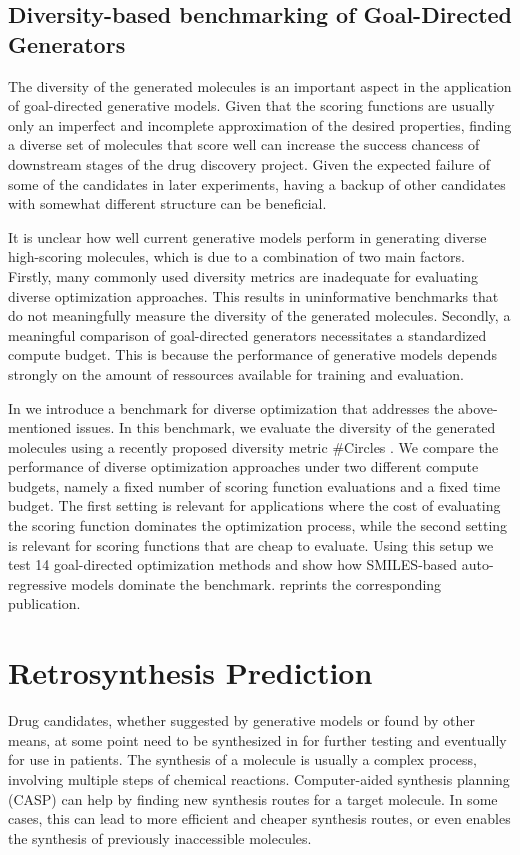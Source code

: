 \subsection{Diversity-based benchmarking of Goal-Directed Generators\label{sec:divopt}}
The diversity of the generated molecules is an important aspect in the
application of goal-directed generative models. Given that the scoring functions
are usually only an imperfect and incomplete approximation of the desired
properties, finding a diverse set of molecules that score well can increase the
success chancess of downstream stages of the drug discovery project. Given the
expected failure of some of the candidates in later experiments, having a backup
of other candidates with somewhat different structure can be beneficial.

It is unclear how well current generative models perform in generating diverse
high-scoring molecules, which is due to a combination of two main factors. 
Firstly, many commonly used diversity metrics are inadequate for evaluating
diverse optimization approaches. This results in uninformative benchmarks that
do not meaningfully measure the diversity of the generated molecules. Secondly,
a meaningful comparison of goal-directed generators necessitates a standardized
compute budget. This is because the performance of generative models depends strongly 
on the amount of ressources available for training and evaluation.

In \citep{renzBenchmarkingEfficiencyGenerative2024} we introduce a benchmark for
diverse optimization that addresses the above-mentioned issues. In this
benchmark, we evaluate the diversity of the generated molecules using a recently
proposed diversity metric \#Circles \citep{xieHowMuchSpace2023}. We compare the
performance of diverse optimization approaches under two different compute
budgets, namely a fixed number of scoring function evaluations and a fixed time
budget. The first setting is relevant for applications where the cost of
evaluating the scoring function dominates the optimization process, while the
second setting is relevant for scoring functions that are cheap to evaluate.
Using this setup we test 14 goal-directed optimization methods and show how
SMILES-based auto-regressive models dominate the benchmark.
 reprints the corresponding publication.

\section{Retrosynthesis Prediction\label{sec:retrosynthesis}}
Drug candidates, whether suggested by generative models or found by other means,
at some point need to be synthesized in for further testing and 
eventually for use in patients. The synthesis of a molecule is usually a complex
process, involving multiple steps of chemical reactions. Computer-aided synthesis 
planning (CASP) can help by finding new synthesis routes for a target molecule.
In some cases, this can lead to more efficient and cheaper synthesis routes, or
even enables the synthesis of previously inaccessible molecules.

